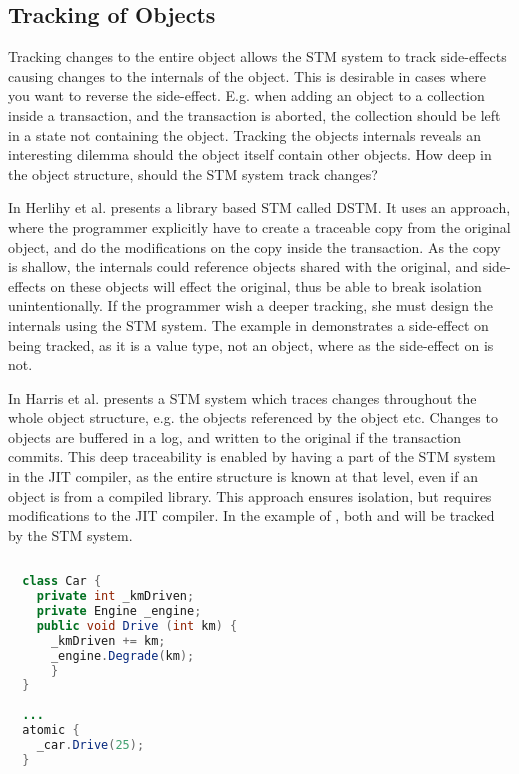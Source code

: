 \subsection{Tracking of Objects}
Tracking changes to the entire object allows the \ac{STM} system to track side-effects causing changes to the internals of the object. This is desirable in cases where you want to reverse the side-effect. E.g. when adding an object to a collection inside a transaction, and the transaction is aborted, the collection should be left in a state not containing the object. Tracking the objects internals reveals an interesting dilemma should the object itself contain other objects. How deep in the object structure, should the \ac{STM} system track changes? 

In \cite{herlihy2003software} Herlihy et al. presents a library based \ac{STM} called DSTM. It uses an approach, where the programmer explicitly have to create a traceable copy from the original object, and do the modifications on the copy inside the transaction. As the copy is shallow, the internals could reference objects shared with the original, and side-effects on these objects will effect the original, thus be able to break isolation unintentionally. If the programmer wish a deeper tracking, she must design the internals using the \ac{STM} system. The example in  demonstrates a side-effect on  being tracked, as it is a value type, not an object, where as the side-effect on  is not.

In \cite{harris2003language} Harris et al. presents a \ac{STM} system which traces changes throughout the whole object structure, e.g. the objects referenced by the object etc. Changes to objects are buffered in a log, and written to the original if the transaction commits. This deep  traceability is enabled by having a part of the \ac{STM} system in the \ac{JIT} compiler, as the entire structure is known at that level, even if an object is from a compiled library. This approach ensures isolation, but requires modifications to the \ac{JIT} compiler. In the example of , both  and  will be tracked by the \ac{STM} system.

\begin{lstlisting}[label=lst:tracking_object,
  float,
  caption={Tracking Changes to Object},
  language=Java,  
  showspaces=false,
  showtabs=false,
  breaklines=true,
  showstringspaces=false,
  breakatwhitespace=true,
  commentstyle=\color{greencomments},
  keywordstyle=\color{bluekeywords},
  stringstyle=\color{redstrings},
  morekeywords={atomic, retry, orElse, var, get, set}]  % Start your code-block
  
  class Car {
    private int _kmDriven;
    private Engine _engine;
    public void Drive (int km) { 
      _kmDriven += km; 
      _engine.Degrade(km);
      }
  }
  
  ...
  atomic {
    _car.Drive(25);
  }
\end{lstlisting}

